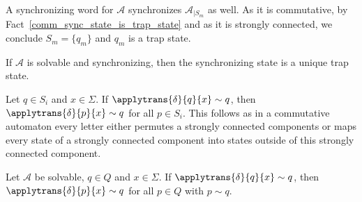 
A synchronizing word for $\mathcal A$ synchronizes $\mathcal A_{|S_m}$ as well.
As it is commutative, by Fact~\ref{comm_sync_state_is_trap_state}
and as it is strongly connected, we conclude $S_m = \{q_m\}$
and $q_m$ is a trap state.

\begin{lemma}
\label{constr_sync:lem:solvable_sync_trap_state}
 If $\mathcal A$ is solvable and synchronizing, then the synchronizing
 state is a unique trap state.
\end{lemma}

Let $q \in S_i$ and $x \in \Sigma$. If $\applytrans{\delta}{q}{x} \sim q$,
then $\applytrans{\delta}{p}{x} \sim q$ for all $p \in S_i$. 
This follows 
as in a commutative automaton every letter either permutes a strongly connected
components or maps every state of a strongly connected component into states
outside of this strongly connected component.

\begin{lemma}
 Let $\mathcal A$ be solvable, $q \in Q$ and $x \in \Sigma$.
 If $\applytrans{\delta}{q}{x} \sim q$,
 then $\applytrans{\delta}{p}{x} \sim q$
 for all $p \in Q$ with $p \sim q$.
\end{lemma}



























